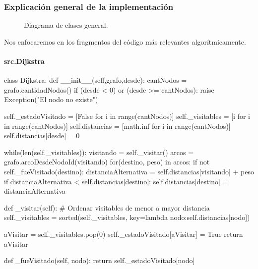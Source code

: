 \documentclass[../tp2_grupo404.tex]{subfiles}
\begin{document}
\subsubsection{Explicación general de la implementación}

\newcommand{\ChangeLine}[1]{%
\ifodd\value{FancyVerbLine}%
\textcolor{gray}{#1}\else\textcolor{black}{#1}\fi}


\begin{figure}[H]
    \centering
    
    \caption{\label{dcGeneral}Diagrama de clases general.}
    \end{figure}

Nos enfocaremos en los fragmentos del código más relevantes algorítmicamente.

\paragraph{src.Dijkstra}

\begin{alternate}[breaklines=true,numbers=left,xleftmargin=5mm]
    class Dijkstra:
    def __init__(self,grafo,desde):
        cantNodos = grafo.cantidadNodos()
        if (desde < 0) or (desde >= cantNodos):
            raise Exception("El nodo no existe")
        
        self._estadoVisitado = [False    for i in range(cantNodos)]
        self._visitables     = [i        for i in range(cantNodos)]
        self.distancias      = [math.inf for i in range(cantNodos)]
        self.distancias[desde] = 0
        
        while(len(self._visitables)):
            visitando = self._visitar()
            arcos = grafo.arcoDesdeNodoId(visitando)
            for(destino, peso) in arcos:
                if not self._fueVisitado(destino):
                    distanciaAlternativa = self.distancias[visitando] + peso
                    if distanciaAlternativa < self.distancias[destino]:
                        self.distancias[destino] = distanciaAlternativa

    def _visitar(self):
        # Ordenar visitables de menor a mayor distancia
        self._visitables = sorted(self._visitables, key=lambda nodo:self.distancias[nodo])

        aVisitar = self._visitables.pop(0)
        self._estadoVisitado[aVisitar] = True
        return aVisitar

    def _fueVisitado(self, nodo):
        return self._estadoVisitado[nodo]
\end{alternate}
\end{document}
